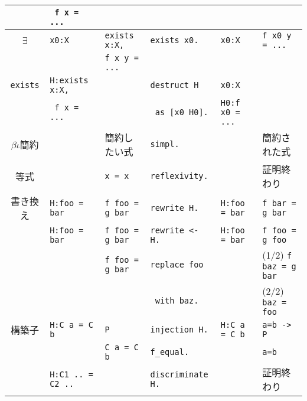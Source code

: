 \documentclass{jarticle}
\begin{document}
\begin{center}
\begin{tabular}{c||l|l||l||l|l}
  & \verb| f x = ...| & & & & \\ \hline \hline
  $\exists$ & \verb|x0:X| & \verb|exists x:X,| & \verb|exists x0.| & \verb|x0:X| & \verb|f x0 y = ...| \\
  & & \verb|f x y = ...| & & & \\ \cline{2-6}
  \verb|exists| & \verb|H:exists x:X,| & & \verb|destruct H| & \verb|x0:X| & \\
  & \verb| f x = ...| & & \verb| as [x0 H0].| & \verb|H0:f x0 = ...| & \\ \hline \hline
  $\beta \iota$簡約 & & 簡約したい式 & \verb|simpl.| & & 簡約された式 \\ \hline \hline
  等式 & & \verb|x = x| & \verb|reflexivity.| & & 証明終わり \\ \hline \hline
  書き換え & \verb|H:foo = bar| & \verb|f foo = g bar| & \verb|rewrite H.| & \verb|H:foo = bar| & \verb|f bar = g bar| \\ \cline{2-6}
  & \verb|H:foo = bar| & \verb|f foo = g bar| & \verb|rewrite <- H.| & \verb|H:foo = bar| & \verb|f foo = g foo| \\ \cline{2-6}
  & & \verb|f foo = g bar| & \verb|replace foo| & & (1/2) \verb|f baz = g bar| \\
  & & & \verb| with baz.| & & (2/2) \verb|baz = foo| \\ \hline \hline
  構築子 & \verb|H:C a = C b| & \verb|P| & \verb|injection H.| & \verb|H:C a = C b| & \verb|a=b -> P| \\ \cline{2-6}
  & & \verb|C a = C b| & \verb|f_equal.| & & \verb|a=b| \\ \cline{2-6}
  & \verb|H:C1 .. = C2 ..| & & \verb|discriminate H.| & & 証明終わり \\ \hline \hline
  \end{tabular}
  \end{center}
  \newpage
\end{document}
